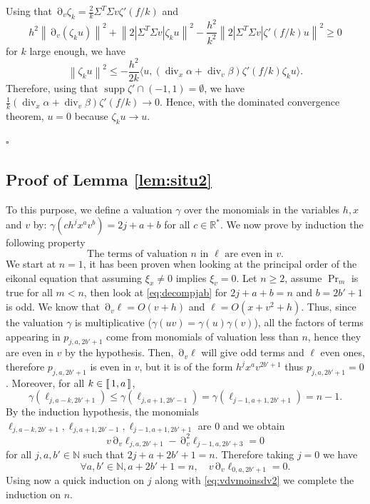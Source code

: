 \documentclass[12pt]{amsart}
\newcommand{\supp}{\operatorname{supp}}
\newcommand{\N}{\mathbb N}
\newcommand{\R}{\mathbb R}
\renewcommand{\div}{\operatorname{div}}
\def\<{\langle}
\def\>{\rangle}
\newcommand{\ep}{\hfill $\square$}
\numberwithin{equation}{section}
\numberwithin{figure}{section}
\DeclareMathOperator{\p}{\partial}
\newcommand{\vvert}[1]{\left\lVert#1\right\rVert}
\newcommand{\lb}{\operatorname{[\negthinspace [}}
\newcommand{\rb}{\operatorname{]\negthinspace ]}}
\begin{document}
Using that $\p_v\zeta_k = \frac2k\Sigma^T\Sigma v\zeta'(f/k)$ and
\begin{equation*}
h^2\vvert{\p_v(\zeta_k u)}^2 + \vvert{2|\Sigma^T\Sigma v|\zeta_k u}^2-\frac{h^2}{k^2}\vvert{2|\Sigma^T\Sigma v|\zeta'(f/k)u}^2\geq0
\end{equation*}
for $k$ large enough, we have
\begin{equation*}
\vvert{\zeta_k u}^2 \leq - \frac{h^2}{2k}\<u,(\div_x\alpha + \div_v\beta)\zeta'(f/k)\zeta_k u\>.
\end{equation*}
Therefore, using that $\supp\zeta' \cap (-1,1) = \emptyset$, we have $\frac1k(\div_x\alpha + \div_v\beta)\zeta'(f/k)\to0$. Hence, with the dominated convergence theorem, $u=0$ because $\zeta_ku\to u$.

\ep










\subsection{Proof of Lemma \ref{lem:situ2}}\label{ssec:lemma}

To this purpose, we define a valuation $\gamma$ over the monomials in the variables $h,x$ and $v$ by: $\gamma(ch^jx^av^b) = 2j+a+b$ for all $c\in\R^*$. We now prove by induction the following property
\begin{equation*}\label{HR}\tag{$\Pr_n$}
\text{The terms of valuation }n\text{ in }\ell\text{ are even in }v.
\end{equation*}
We start at $n=1$, it has been proven when looking at the principal order of the eikonal equation that assuming $\xi_x \neq 0$ implies $\xi_v = 0$. Let $n\geq2$, assume $\Pr_m$ is true for all $m<n$, then look at \eqref{eq:decompjab} for $2j+a+b = n$ and $b=2b'+1$ is odd. We know that $\p_v\ell = O(v+h)$ and $\ell = O(x + v^2 + h)$. Thus, since the valuation $\gamma$ is multiplicative ($\gamma(uv) = \gamma(u)\gamma(v)$), all the factors of terms appearing in $p_{j,a,2b'+1}$ come from monomials of valuation less than $n$, hence they are even in $v$ by the hypothesis. Then, $\p_v\ell$ will give odd terms and $\ell$ even ones, therefore $p_{j,a,2b'+1}$ is even in $v$, but it is of the form $h^jx^av^{2b'+1}$ thus $p_{j,a,2b'+1} = 0$. Moreover, for all $k\in\lb1,a\rb$,
\begin{equation*}
\gamma(\ell_{j,a-k,2b'+1}) \leq \gamma(\ell_{j,a+1,2b'-1}) = \gamma(\ell_{j-1,a+1,2b'+1}) = n-1.
\end{equation*}
By the induction hypothesis, the monomials $\ell_{j,a-k,2b'+1}, \ell_{j,a+1,2b'-1}, \ell_{j-1,a+1,2b'+1}$ are $0$ and we obtain
\begin{equation}\label{eq:vdvmoinsdv2}
v\p_v\ell_{j,a,2b'+1} - \p_v^2\ell_{j-1,a,2b'+3} = 0
\end{equation}
for all $j,a,b'\in\N$ such that $2j+a+2b'+1 = n$. Therefore taking $j=0$ we have
\begin{equation*}
\forall a,b'\in\N,a+2b'+1=n,\quad v\p_v\ell_{0,a,2b'+1} = 0.
\end{equation*}
Using now a quick induction on $j$ along with \eqref{eq:vdvmoinsdv2} we complete the induction on $n$.
\end{document}
